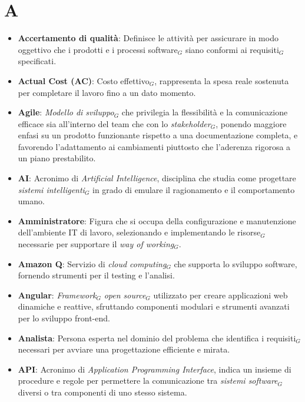 \section{A}
\begin{itemize}
    \item \textbf{Accertamento di qualità}: Definisce le attività per assicurare in modo oggettivo che i prodotti e i processi software$_G$ siano conformi ai requisiti$_G$ specificati.
    \item \textbf{Actual Cost (AC)}: Costo effettivo$_G$, rappresenta la spesa reale sostenuta per completare il lavoro fino a un dato momento.
    \item \textbf{Agile}: \textit{Modello di sviluppo}$_G$ che privilegia la flessibilità e la comunicazione efficace sia all'interno del team che con lo \textit{stakeholder}$_G$, ponendo maggiore enfasi su un prodotto funzionante rispetto a una documentazione completa, e favorendo l'adattamento ai cambiamenti piuttosto che l'aderenza rigorosa a un piano prestabilito.
    \item \textbf{AI}: Acronimo di \textit{Artificial Intelligence}, disciplina che studia come progettare \textit{sistemi intelligenti}$_G$ in grado di emulare il ragionamento e il comportamento umano.
    \item \textbf{Amministratore}: Figura che si occupa della configurazione e manutenzione dell'ambiente IT di lavoro, selezionando e implementando le risorse$_G$ necessarie per supportare il \textit{way of working}$_G$.
    \item \textbf{Amazon Q}: Servizio di \textit{cloud computing}$_G$ che supporta lo sviluppo software, fornendo strumenti per il testing e l’analisi.
    \item \textbf{Angular}: \textit{Framework}$_G$ \textit{open source}$_G$ utilizzato per creare applicazioni web dinamiche e reattive, sfruttando componenti modulari e strumenti avanzati per lo sviluppo front-end.
    \item \textbf{Analista}: Persona esperta nel dominio del problema che identifica i requisiti$_G$ necessari per avviare una progettazione efficiente e mirata.
    \item \textbf{API}: Acronimo di \textit{Application Programming Interface}, indica un insieme di procedure e regole per permettere la comunicazione tra \textit{sistemi software}$_G$ diversi o tra componenti di uno stesso sistema.

\end{itemize}
